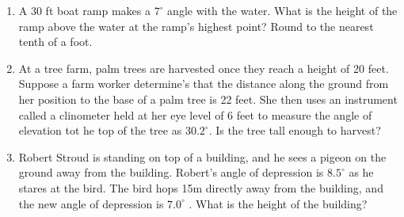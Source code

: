 \begin{enumerate}
\begin{enumerate}
	
	\vfill

\item {}
	
	\vfill

\end{enumerate}
\clearpage

\item A 30 ft boat ramp makes a $7^\circ$ angle with the water.  What
  is the height of the ramp above the water at the ramp's highest
  point?  Round to the nearest tenth of a foot.

  \vfill


\item At a tree farm, palm trees are harvested once they reach a
  height of 20 feet.  Suppose a farm worker determine's that the
  distance along the ground from her position to the base of a palm
  tree is 22 feet.  She then uses an instrument called a clinometer
  held at her eye level of 6 feet to measure the angle of elevation
  tot he top of the tree as $30.2^\circ$.  Is the tree tall enough to
  harvest?

  \vfill

  \clearpage

\item Robert Stroud is standing on top of a building, and he sees a
  pigeon on the ground away from the building. Robert’s angle of
  depression is $8.5^\circ$ as he stares at the bird. The bird hops
  15m directly away from the building, and the new angle of depression
  is $7.0^\circ$ .  What is the height of the building?


  \vfill

\end{enumerate}


